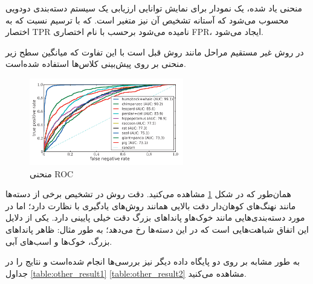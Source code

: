 منحنی یاد شده، یک نمودار برای نمایش توانایی ارزیابی یک سیستم دسته‌بندی دودویی محسوب می‌شود که آستانه تشخیص آن نیز متغیر است. که با ترسیم نسبت 
که به اختصار TPR نامیده می‌شود برحسب 
با نام اختصاری FPR، ایجاد می‌شود.

در روش غیر مستقیم مراحل مانند روش قبل است با این تفاوت که میانگین سطح زیر منحنی بر روی پیش‌بینی کلاس‌ها استفاده شده‌است.

\begin{figure}[h]
	\centering
	\includegraphics[width=0.6\textwidth]{img/report/ROC}
	\caption{منحنی ROC \cite{Lampert2014}}
	\label{fig:ROC}
	\centering
\end{figure}
همان‌طور که در شکل 
\ref{fig:ROC}
مشاهده می‌کنید. دقت روش در تشخیص برخی از دسته‌ها مانند نهنگ‌های کوهان‌دار دقت بالایی همانند روش‌های یادگیری با نظارت دارد؛ اما در مورد دسته‌بندی‌هایی مانند خوک‌هاو پاندا‌های بزرگ دقت خیلی پایینی دارد. یکی از دلایل این اتفاق شباهت‌هایی است که در این دسته‌ها رخ می‌دهد؛ به طور مثال: ظاهر پاندا‌های بزرگ، خوک‌ها و اسب‌های آبی.

به طور مشابه بر روی دو پایگاه داده دیگر نیز بررسی‌ها انجام شده‌است و نتایج را در جداول 
\ref{table:other_result1}
\ref{table:other_result2}
مشاهده می‌کنید.

